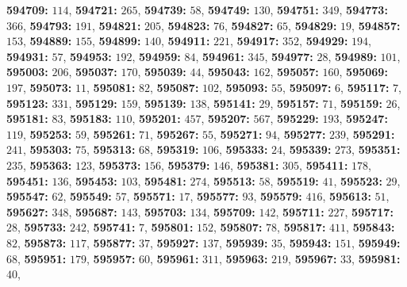 \textsf{\bfseries 594709:} $114$, \textsf{\bfseries 594721:} $265$, \textsf{\bfseries 594739:} $58$, \textsf{\bfseries 594749:} $130$, \textsf{\bfseries 594751:} $349$, \textsf{\bfseries 594773:} $366$, \textsf{\bfseries 594793:} $191$, \textsf{\bfseries 594821:} $205$, \textsf{\bfseries 594823:} $76$, \textsf{\bfseries 594827:} $65$, \textsf{\bfseries 594829:} $19$, \textsf{\bfseries 594857:} $153$, \textsf{\bfseries 594889:} $155$, \textsf{\bfseries 594899:} $140$, \textsf{\bfseries 594911:} $221$, \textsf{\bfseries 594917:} $352$, \textsf{\bfseries 594929:} $194$, \textsf{\bfseries 594931:} $57$, \textsf{\bfseries 594953:} $192$, \textsf{\bfseries 594959:} $84$, \textsf{\bfseries 594961:} $345$, \textsf{\bfseries 594977:} $28$, \textsf{\bfseries 594989:} $101$, \textsf{\bfseries 595003:} $206$, \textsf{\bfseries 595037:} $170$, \textsf{\bfseries 595039:} $44$, \textsf{\bfseries 595043:} $162$, \textsf{\bfseries 595057:} $160$, \textsf{\bfseries 595069:} $197$, \textsf{\bfseries 595073:} $11$, \textsf{\bfseries 595081:} $82$, \textsf{\bfseries 595087:} $102$, \textsf{\bfseries 595093:} $55$, \textsf{\bfseries 595097:} $6$, \textsf{\bfseries 595117:} $7$, \textsf{\bfseries 595123:} $331$, \textsf{\bfseries 595129:} $159$, \textsf{\bfseries 595139:} $138$, \textsf{\bfseries 595141:} $29$, \textsf{\bfseries 595157:} $71$, \textsf{\bfseries 595159:} $26$, \textsf{\bfseries 595181:} $83$, \textsf{\bfseries 595183:} $110$, \textsf{\bfseries 595201:} $457$, \textsf{\bfseries 595207:} $567$, \textsf{\bfseries 595229:} $193$, \textsf{\bfseries 595247:} $119$, \textsf{\bfseries 595253:} $59$, \textsf{\bfseries 595261:} $71$, \textsf{\bfseries 595267:} $55$, \textsf{\bfseries 595271:} $94$, \textsf{\bfseries 595277:} $239$, \textsf{\bfseries 595291:} $241$, \textsf{\bfseries 595303:} $75$, \textsf{\bfseries 595313:} $68$, \textsf{\bfseries 595319:} $106$, \textsf{\bfseries 595333:} $24$, \textsf{\bfseries 595339:} $273$, \textsf{\bfseries 595351:} $235$, \textsf{\bfseries 595363:} $123$, \textsf{\bfseries 595373:} $156$, \textsf{\bfseries 595379:} $146$, \textsf{\bfseries 595381:} $305$, \textsf{\bfseries 595411:} $178$, \textsf{\bfseries 595451:} $136$, \textsf{\bfseries 595453:} $103$, \textsf{\bfseries 595481:} $274$, \textsf{\bfseries 595513:} $58$, \textsf{\bfseries 595519:} $41$, \textsf{\bfseries 595523:} $29$, \textsf{\bfseries 595547:} $62$, \textsf{\bfseries 595549:} $57$, \textsf{\bfseries 595571:} $17$, \textsf{\bfseries 595577:} $93$, \textsf{\bfseries 595579:} $416$, \textsf{\bfseries 595613:} $51$, \textsf{\bfseries 595627:} $348$, \textsf{\bfseries 595687:} $143$, \textsf{\bfseries 595703:} $134$, \textsf{\bfseries 595709:} $142$, \textsf{\bfseries 595711:} $227$, \textsf{\bfseries 595717:} $28$, \textsf{\bfseries 595733:} $242$, \textsf{\bfseries 595741:} $7$, \textsf{\bfseries 595801:} $152$, \textsf{\bfseries 595807:} $78$, \textsf{\bfseries 595817:} $411$, \textsf{\bfseries 595843:} $82$, \textsf{\bfseries 595873:} $117$, \textsf{\bfseries 595877:} $37$, \textsf{\bfseries 595927:} $137$, \textsf{\bfseries 595939:} $35$, \textsf{\bfseries 595943:} $151$, \textsf{\bfseries 595949:} $68$, \textsf{\bfseries 595951:} $179$, \textsf{\bfseries 595957:} $60$, \textsf{\bfseries 595961:} $311$, \textsf{\bfseries 595963:} $219$, \textsf{\bfseries 595967:} $33$, \textsf{\bfseries 595981:} $40$, 
